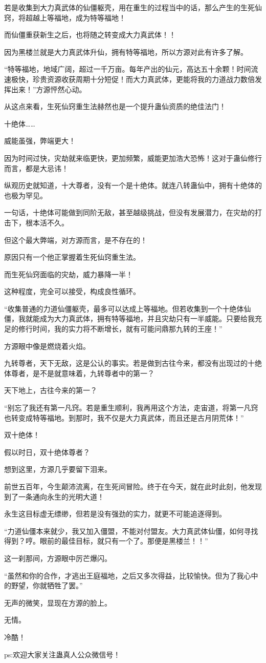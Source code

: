 \begin{this_body}
若是收集到大力真武体的仙僵躯壳，用在重生的过程当中的话，那么产生的生死仙窍，将超越上等福地，成为特等福地！

而仙僵重获新生之后，也将随之转变成大力真武体！！

因为黑楼兰就是大力真武体升仙，拥有特等福地，所以方源对此有许多了解。

“特等福地，地域广阔，超过一千万亩。每年产出的仙元，高达五十余颗！时间流速极快，珍贵资源收获周期十分短促！而大力真武体，更能将我的力道战力数倍发挥出来！”方源怦然心动。

从这点来看，生死仙窍重生法赫然也是一个提升蛊仙资质的绝佳法门！

十绝体……

威能虽强，弊端更大！

因为时间过快，灾劫就来临更快，更加频繁，威能更加浩大恐怖！这对于蛊仙修行而言，都是大忌讳！

纵观历史就知道，十大尊者，没有一个是十绝体。就连八转蛊仙中，拥有十绝体的也极为罕见。

一句话，十绝体可能做到同阶无敌，甚至越级挑战，但没有发展潜力，在灾劫的打击下，根本活不久。

但这个最大弊端，对方源而言，是不存在的！

原因只有一个他正掌握着生死仙窍重生法。

而生死仙窍面临的灾劫，威力暴降一半！

这种程度，完全可以接受，构成良性循环。

“收集普通的力道仙僵躯壳，最多可以达成上等福地。但若收集到一个十绝体仙僵，我就能成为大力真武体，拥有特等福地，并且灾劫只有一半威能。只要给我充足的修行时间，我的实力将不断增长，就有可能问鼎那九转的王座！”

方源眼中像是燃烧着火焰。

九转尊者，天下无敌，这是公认的事实。若是做到古往今来，都没有出现过的十绝体尊者，是不是就意味着，九转尊者中的第一？

天下地上，古往今来的第一？

“别忘了我还有第一凡窍。若是重生顺利，我再用这个方法，走宙道，将第一凡窍也转变成特等福地。到那时，我不仅是大力真武体，而且还是古月阴荒体！”

双十绝体！

假以时日，双十绝体尊者？

想到这里，方源几乎要留下泪来。

前世五百年，今生颠沛流离，在生死间冒险。终于在今天，就在此时此刻，他发现到了一条通向永生的光明大道！

永生这目标虚无缥缈，但若是没有强劲的实力，就更不可能追逐得到。

“力道仙僵本来就少，我又加入僵盟，不能对付盟友。大力真武体仙僵，如何寻找得到？哼。眼前的最佳目标，就只有一个了。那便是黑楼兰！！”

这一刹那间，方源眼中厉芒爆闪。

“虽然和你的合作，才逃出王庭福地，之后又多次得益，比较愉快。但为了我心中的野望，你就牺牲了罢。”

无声的微笑，显现在方源的脸上。

无情。

冷酷！

ps:欢迎大家关注蛊真人公众微信号！

\end{this_body}

